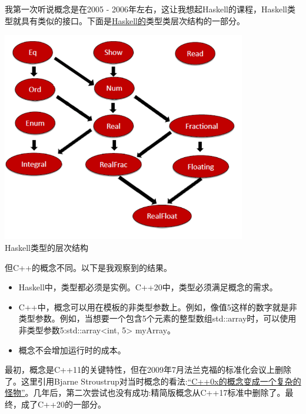 
我第一次听说概念是在2005 - 2006年左右，这让我想起Haskell的课程，Haskell类型就具有类似的接口。下面是\href{https://en.wikipedia.org/wiki/Haskell_(programming_language)}{Haskell的}类型类层次结构的一部分。

\begin{center}
\includegraphics[width=0.8\textwidth]{content/3/chapter4/images/7.png}\\
Haskell类型的层次结构
\end{center}

但C++的概念不同。以下是我观察到的结果。

\begin{itemize}
\item
Haskell中，类型都必须是实例。C++20中，类型必须满足概念的需求。

\item
C++中，概念可以用在模板的非类型参数上。例如，像值5这样的数字就是非类型参数。例如，当想要一个包含5个元素的整型数组std::array时，可以使用非类型参数5:std::array<int, 5> myArray。

\item
概念不会增加运行时的成本。
\end{itemize}

最初，概念是C++11的关键特性，但在2009年7月法兰克福的标准化会议上删除了。这里引用Bjarne Stroustrup对当时概念的看法:\href{https://isocpp.org/blog/2013/02/concepts-lite-constraining-templates-with-predicates-andrew-sutton-bjarne-s}{“C++0x的概念变成一个复杂的怪物”}。几年后，第二次尝试也没有成功:精简版概念从C++17标准中删除了。最终，成了C++20的一部分。

